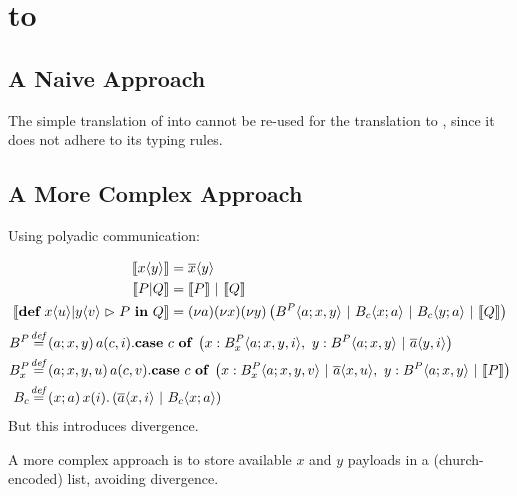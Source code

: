 \section{\CoreJoinCalc to \ActorPiCalc}

\subsection{A Naive Approach}

The simple translation of \joincalc into \asyncpicalc \cite{fournet_reflexive_1996} cannot be re-used for the translation to \actorpicalc,
since it does not adhere to its typing rules.




\subsection{A More Complex Approach}

Using polyadic communication:

\begin{align}
  \begin{split}
    \encMJtoAP{\jsnd{x}{y}}
    &= \asnd{x}{y} \\
    \encMJtoAP{P \jpar Q}
    &= \encMJtoAP{P} \apar \encMJtoAP{Q} \\
    \encMJtoAP{\jdef{\jrct{\jrcv{x}{u} \jpat \jrcv{y}{v}}{P}}{Q}}
    &= \anew{a}{\anew{x}{\anew*{y}{ \ains{B^P}{a}{x,y} \apar \ains{B_c}{x}{a} \apar \ains{B_c}{y}{a} \apar \encMJtoAP{Q}}}} \\
  \end{split}
\end{align}
\begin{align}
  \adef*{B^P}{a}{x,y}{
    \arcv{a}{c,i} . \acse{c}{
       \aalt{x}{\ains{B_x^P}{a}{x,y,i}},\ 
       \aalt{y}{\ains{B^P}{a}{x,y} \apar \asnd{a}{y,i}}
     }
  } \\
  \adef*{B_x^P}{a}{x,y,u}{
    \arcv{a}{c,v} . \acse{c}{
      \aalt{x}{\ains{B_x^P}{a}{x,y,v} \apar \asnd{a}{x,u}},\ 
      \aalt{y}{\ains{B^P}{a}{x,y} \apar \encMJtoAP{P}}
    } \\
  }
  \adef*{B_c}{x}{a}{
    \arcv{x}{i} . \parens{\asnd{a}{x,i} \apar \ains{B_c}{x}{a}}
  }
\end{align}
But this introduces divergence.


A more complex approach is to store available $x$ and $y$ payloads in a (church-encoded) list, avoiding divergence.

